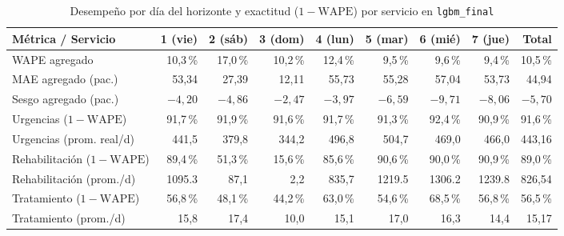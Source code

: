 
\begin{table}[htbp]
\caption{Desempeño por día del horizonte y exactitud ($1-\text{WAPE}$) por servicio en \texttt{lgbm\_final}}
\label{tab:anexo_horizonte}
{\singlespacing\footnotesize
\begin{tabularx}{\textwidth}{@{}Y r r r r r r r r@{}}
\toprule
Métrica / Servicio & 1 (vie) & 2 (sáb) & 3 (dom) & 4 (lun) & 5 (mar) & 6 (mié) & 7 (jue) & Total \\
\midrule
WAPE agregado & 10,3\,\% & 17,0\,\% & 10,2\,\% & 12,4\,\% & 9,5\,\% & 9,6\,\% & 9,4\,\% & 10,5\,\% \\
MAE agregado (pac.) & 53,34 & 27,39 & 12,11 & 55,73 & 55,28 & 57,04 & 53,73 & 44,94 \\
Sesgo agregado (pac.) & $-4{,}20$ & $-4{,}86$ & $-2{,}47$ & $-3{,}97$ & $-6{,}59$ & $-9{,}71$ & $-8{,}06$ & $-5{,}70$ \\
\midrule
Urgencias ($1-\text{WAPE}$) & 91,7\,\% & 91,9\,\% & 91,6\,\% & 91,7\,\% & 91,3\,\% & 92,4\,\% & 90,9\,\% & 91,6\,\% \\
Urgencias (prom. real/d) & 441,5 & 379,8 & 344,2 & 496,8 & 504,7 & 469,0 & 466,0 & 443,16 \\
Rehabilitación ($1-\text{WAPE}$) & 89,4\,\% & 51,3\,\% & 15,6\,\% & 85,6\,\% & 90,6\,\% & 90,0\,\% & 90,9\,\% & 89,0\,\% \\
Rehabilitación (prom./d) & \num{1095,3} & 87,1 & 2,2 & 835,7 & \num{1219,5} & \num{1306,2} & \num{1239,8} & 826,54 \\
Tratamiento ($1-\text{WAPE}$) & 56,8\,\% & 48,1\,\% & 44,2\,\% & 63,0\,\% & 54,6\,\% & 68,5\,\% & 56,8\,\% & 56,5\,\% \\
Tratamiento (prom./d) & 15,8 & 17,4 & 10,0 & 15,1 & 17,0 & 16,3 & 14,4 & 15,17 \\
\bottomrule
\end{tabularx}}
\end{table}


